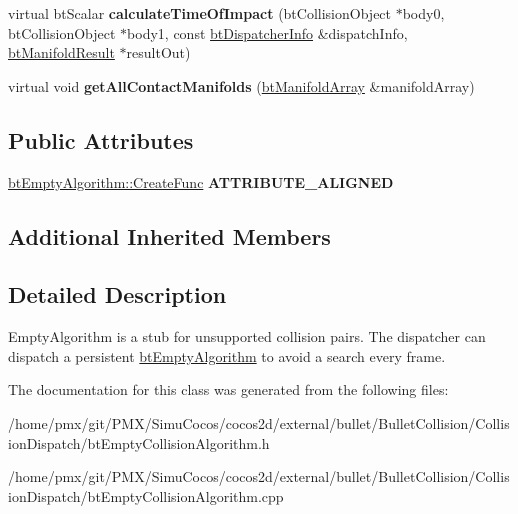 \begin{DoxyCompactItemize}
\item 
\mbox{\label{classbtEmptyAlgorithm_aee5352d0ea8fe347835e4158e8134b9e}} 
virtual bt\+Scalar {\bfseries calculate\+Time\+Of\+Impact} (bt\+Collision\+Object $\ast$body0, bt\+Collision\+Object $\ast$body1, const \hyperlink{structbtDispatcherInfo}{bt\+Dispatcher\+Info} \&dispatch\+Info, \hyperlink{classbtManifoldResult}{bt\+Manifold\+Result} $\ast$result\+Out)
\item 
\mbox{\label{classbtEmptyAlgorithm_aa43e4b766663a04a38d30f43bed2133b}} 
virtual void {\bfseries get\+All\+Contact\+Manifolds} (\hyperlink{classbtAlignedObjectArray}{bt\+Manifold\+Array} \&manifold\+Array)
\end{DoxyCompactItemize}
\subsection*{Public Attributes}
\begin{DoxyCompactItemize}
\item 
\mbox{\label{classbtEmptyAlgorithm_aacc54a2100d823dbe8c3c2d420f26eec}} 
\hyperlink{structbtEmptyAlgorithm_1_1CreateFunc}{bt\+Empty\+Algorithm\+::\+Create\+Func} {\bfseries A\+T\+T\+R\+I\+B\+U\+T\+E\+\_\+\+A\+L\+I\+G\+N\+ED}
\end{DoxyCompactItemize}
\subsection*{Additional Inherited Members}


\subsection{Detailed Description}
Empty\+Algorithm is a stub for unsupported collision pairs. The dispatcher can dispatch a persistent \hyperlink{classbtEmptyAlgorithm}{bt\+Empty\+Algorithm} to avoid a search every frame. 

The documentation for this class was generated from the following files\+:\begin{DoxyCompactItemize}
\item 
/home/pmx/git/\+P\+M\+X/\+Simu\+Cocos/cocos2d/external/bullet/\+Bullet\+Collision/\+Collision\+Dispatch/bt\+Empty\+Collision\+Algorithm.\+h\item 
/home/pmx/git/\+P\+M\+X/\+Simu\+Cocos/cocos2d/external/bullet/\+Bullet\+Collision/\+Collision\+Dispatch/bt\+Empty\+Collision\+Algorithm.\+cpp\end{DoxyCompactItemize}
